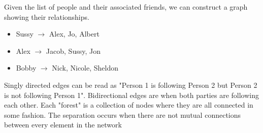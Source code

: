 \documentclass{article}
\begin{document}
Given the list of people and their associated friends, we can construct a graph showing their relationships.
\begin{itemize}
\item Sussy $\rightarrow$ Alex, Jo, Albert
\item Alex $\rightarrow$ Jacob, Sussy, Jon
\item Bobby $\rightarrow$ Nick, Nicole, Sheldon
\end{itemize}

Singly directed edges can be read as "Person 1 is following Person 2 but Person 2 is not following Person 1".
Bidirectional edges are when both parties are following each other.
Each "forest" is a collection of  nodes where they are all connected in some fashion.
The separation occurs when there are not mutual connections between every element in the network
\end{document}

